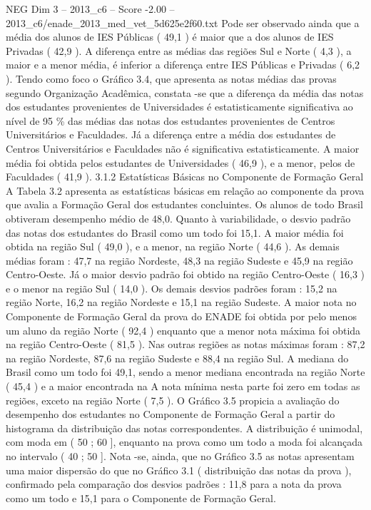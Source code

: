 \begin{textsample}{NEG Dim 3 – 2013\_c6 – Score -2.00 – 2013\_c6/enade\_2013\_med\_vet\_5d625e2f60.txt}
Pode ser observado ainda que a média dos alunos de IES Públicas ( 49,1 ) é maior que a dos alunos de IES Privadas ( 42,9 ).
A diferença entre as médias das regiões Sul e Norte ( 4,3 ), a maior e a menor média, é inferior a diferença entre IES Públicas e Privadas ( 6,2 ).
Tendo como foco o Gráfico 3.4, que apresenta as notas médias das provas segundo Organização Acadêmica, constata -se que a diferença da média das notas dos estudantes provenientes de Universidades é estatisticamente significativa ao nível de 95 \% das médias das notas dos estudantes provenientes de Centros Universitários e Faculdades.
Já a diferença entre a média dos estudantes de Centros Universitários e Faculdades não é significativa estatisticamente.
A maior média foi obtida pelos estudantes de Universidades ( 46,9 ), e a menor, pelos de Faculdades ( 41,9 ). 3.1.2 Estatísticas Básicas no Componente de Formação Geral A Tabela 3.2 apresenta as estatísticas básicas em relação ao componente da prova que avalia a Formação Geral dos estudantes concluintes.
Os alunos de todo Brasil obtiveram desempenho médio de 48,0.
Quanto à variabilidade, o desvio padrão das notas dos estudantes do Brasil como um todo foi 15,1.
A maior média foi obtida na região Sul ( 49,0 ), e a menor, na região Norte ( 44,6 ).
As demais médias foram : 47,7 na região Nordeste, 48,3 na região Sudeste e 45,9 na região Centro-Oeste.
Já o maior desvio padrão foi obtido na região Centro-Oeste ( 16,3 ) e o menor na região Sul ( 14,0 ).
Os demais desvios padrões foram : 15,2 na região Norte, 16,2 na região Nordeste e 15,1 na região Sudeste.
A maior nota no Componente de Formação Geral da prova do ENADE foi obtida por pelo menos um aluno da região Norte ( 92,4 ) enquanto que a menor nota máxima foi obtida na região Centro-Oeste ( 81,5 ).
Nas outras regiões as notas máximas foram : 87,2 na região Nordeste, 87,6 na região Sudeste e 88,4 na região Sul.
A mediana do Brasil como um todo foi 49,1, sendo a menor mediana encontrada na região Norte ( 45,4 ) e a maior encontrada na A nota mínima nesta parte foi zero em todas as regiões, exceto na região Norte ( 7,5 ).
O Gráfico 3.5 propicia a avaliação do desempenho dos estudantes no Componente de Formação Geral a partir do histograma da distribuição das notas correspondentes.
A distribuição é unimodal, com moda em ( 50 ; 60 ], enquanto na prova como um todo a moda foi alcançada no intervalo ( 40 ; 50 ].
Nota -se, ainda, que no Gráfico 3.5 as notas apresentam uma maior dispersão do que no Gráfico 3.1 ( distribuição das notas da prova ), confirmado pela comparação dos desvios padrões : 11,8 para a nota da prova como um todo e 15,1 para o Componente de Formação Geral.

\end{textsample}
